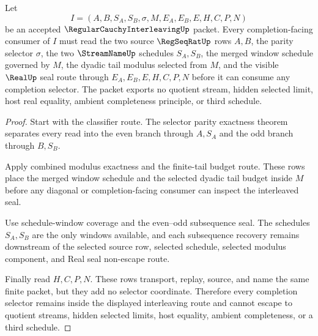 \begin{theorem}
\label{thm:regular-cauchy-interleaving-completion-selector-nonescape}
Let
$$
I=(A,B,S_A,S_B,\sigma,M,E_A,E_B,E,H,C,P,N)
$$
be an accepted $\RegularCauchyInterleavingUp$ packet. Every completion-facing consumer of $I$ must read the two source $\RegSeqRatUp$ rows $A,B$, the parity selector $\sigma$, the two $\StreamNameUp$ schedules $S_A,S_B$, the merged window schedule governed by $M$, the dyadic tail modulus selected from $M$, and the visible $\RealUp$ seal route through $E_A,E_B,E,H,C,P,N$ before it can consume any completion selector. The packet exports no quotient stream, hidden selected limit, host real equality, ambient completeness principle, or third schedule.
\end{theorem}
\begin{proof}
Start with the classifier route. The selector parity exactness theorem separates every read into the even branch through $A,S_A$ and the odd branch through $B,S_B$.

Apply combined modulus exactness and the finite-tail budget route. These rows place the merged window schedule and the selected dyadic tail budget inside $M$ before any diagonal or completion-facing consumer can inspect the interleaved seal.

Use schedule-window coverage and the even--odd subsequence seal. The schedules $S_A,S_B$ are the only windows available, and each subsequence recovery remains downstream of the selected source row, selected schedule, selected modulus component, and Real seal non-escape route.

Finally read $H,C,P,N$. These rows transport, replay, source, and name the same finite packet, but they add no selector coordinate. Therefore every completion selector remains inside the displayed interleaving route and cannot escape to quotient streams, hidden selected limits, host equality, ambient completeness, or a third schedule.
\end{proof}


